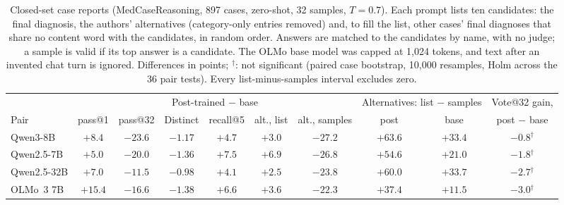 \documentclass[wcp]{jmlr}
\begin{document}
\begin{table}[t]
\medskip
\begin{adjustbox}{max width=\linewidth}
\begin{tabular}{lccccccccc}
\toprule
 & \multicolumn{6}{c}{Post-trained $-$ base} & \multicolumn{2}{c}{Alternatives: list $-$ samples} & Vote@32 gain, \\
Pair & pass@1 & pass@32 & Distinct & recall@5 & alt., list & alt., samples & post & base & post $-$ base \\
\midrule
Qwen3-8B & $+8.4$ & $-23.6$ & $-1.17$ & $+4.7$ & $+3.0$ & $-27.2$ & $+63.6$ & $+33.4$ & $-0.8$$^{\dagger}$ \\
Qwen2.5-7B & $+5.0$ & $-20.0$ & $-1.36$ & $+7.5$ & $+6.9$ & $-26.8$ & $+54.6$ & $+21.0$ & $-1.8$$^{\dagger}$ \\
Qwen2.5-32B & $+7.0$ & $-11.5$ & $-0.98$ & $+4.1$ & $+2.5$ & $-23.8$ & $+60.0$ & $+33.7$ & $-2.7$$^{\dagger}$ \\
OLMo~3 7B & $+15.4$ & $-16.6$ & $-1.38$ & $+6.6$ & $+3.6$ & $-22.3$ & $+37.4$ & $+11.5$ & $-3.0$$^{\dagger}$ \\
\bottomrule
\end{tabular}
\end{adjustbox}
\caption{Closed-set case reports (MedCaseReasoning, 897 cases, zero-shot, 32 samples, $T{=}0.7$). Each prompt lists ten candidates: the final diagnosis, the authors' alternatives (category-only entries removed) and, to fill the list, other cases' final diagnoses that share no content word with the candidates, in random order. Answers are matched to the candidates by name, with no judge; a sample is valid if its top answer is a candidate. The OLMo base model was capped at 1,024 tokens, and text after an invented chat turn is ignored. Differences in points; $^{\dagger}$: not significant (paired case bootstrap, 10,000 resamples, Holm across the 36 pair tests). Every list-minus-samples interval excludes zero.}
\label{tab:closedcase}
\end{table}
\end{document}
